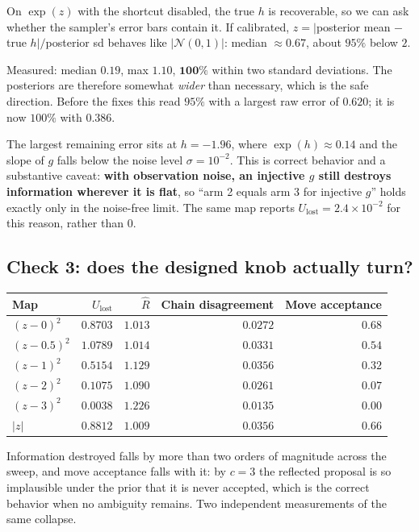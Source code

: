 \documentclass[11pt]{article}
\newcommand{\Norm}{\mathcal{N}}
\newcommand{\Ulost}{U_{\text{lost}}}
\begin{document}
On $\exp(z)$ with the shortcut disabled, the true $h$ is recoverable, so we can
ask whether the sampler's error bars contain it. If calibrated,
$z=|$posterior mean $-$ true $h|/$posterior sd behaves like $|\Norm(0,1)|$:
median $\approx0.67$, about $95\%$ below $2$.

Measured: median $0.19$, max $1.10$, $\mathbf{100\%}$ within two standard
deviations. The posteriors are therefore somewhat \emph{wider} than necessary,
which is the safe direction. Before the fixes this read $95\%$ with a largest raw
error of $0.620$; it is now $100\%$ with $0.386$.

The largest remaining error sits at $h=-1.96$, where $\exp(h)\approx0.14$ and the
slope of $g$ falls below the noise level $\sigma=10^{-2}$. This is correct
behavior and a substantive caveat: \textbf{with observation noise, an injective
$g$ still destroys information wherever it is flat}, so ``arm 2 equals arm 3 for
injective $g$'' holds exactly only in the noise-free limit. The same map reports
$\Ulost=2.4\times10^{-2}$ for this reason, rather than $0$.

\subsection{Check 3: does the designed knob actually turn?}

\begin{center}
\begin{tabular}{lrrrr}
\toprule
Map & $\Ulost$ & $\hat R$ & Chain disagreement & Move acceptance \\
\midrule
$(z-0)^2$   & $0.8703$ & $1.013$ & $0.0272$ & $0.68$ \\
$(z-0.5)^2$ & $1.0789$ & $1.014$ & $0.0331$ & $0.54$ \\
$(z-1)^2$   & $0.5154$ & $1.129$ & $0.0356$ & $0.32$ \\
$(z-2)^2$   & $0.1075$ & $1.090$ & $0.0261$ & $0.07$ \\
$(z-3)^2$   & $0.0038$ & $1.226$ & $0.0135$ & $0.00$ \\
$|z|$       & $0.8812$ & $1.009$ & $0.0356$ & $0.66$ \\
\bottomrule
\end{tabular}
\end{center}

Information destroyed falls by more than two orders of magnitude across the
sweep, and move acceptance falls with it: by $c=3$ the reflected proposal is so
implausible under the prior that it is never accepted, which is the correct
behavior when no ambiguity remains. Two independent measurements of the same
collapse.
\end{document}
